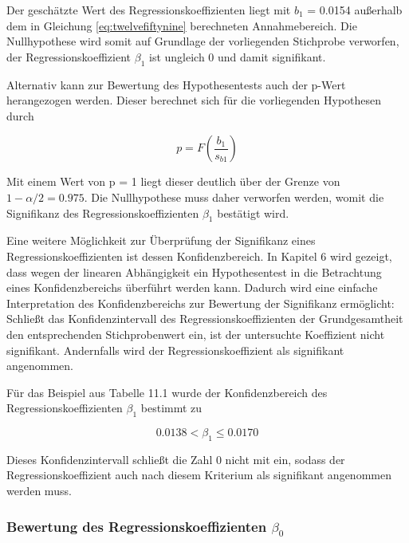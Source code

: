 \noindent Der gesch\"{a}tzte Wert des Regressionskoeffizienten liegt mit $b_{1}$ = 0.0154 au{\ss}erhalb dem in Gleichung \eqref{eq:twelvefiftynine} berechneten Annahmebereich. Die Nullhypothese wird somit auf Grundlage der vorliegenden Stichprobe verworfen, der Regressionskoeffizient $\beta_{1}$ ist ungleich 0 und damit signifikant.\newline

\noindent Alternativ kann zur Bewertung des Hypothesentests auch der p-Wert herangezogen werden. Dieser berechnet sich f\"{u}r die vorliegenden Hypothesen durch

\begin{equation}\label{eq:twelvesixty}
p=F\left(\dfrac{b_{1}}{s_{b1}} \right)
\end{equation}

\noindent Mit einem Wert von p = 1 liegt dieser deutlich \"{u}ber der Grenze von $1 - \alpha/2 = 0.975$. Die Nullhypothese muss daher verworfen werden, womit die Signifikanz des Regressionskoeffizienten $\beta_{1}$ best\"{a}tigt wird.\newline

\noindent Eine weitere M\"{o}glichkeit zur \"{U}berpr\"{u}fung der Signifikanz eines Regressionskoeffizienten ist dessen Konfidenzbereich. In Kapitel 6 wird gezeigt, dass wegen der linearen Abh\"{a}ngigkeit ein Hypothesentest in die Betrachtung eines Konfidenzbereichs \"{u}berf\"{u}hrt werden kann. Dadurch wird eine einfache Interpretation des Konfidenzbereichs zur Bewertung der Signifikanz erm\"{o}glicht: Schlie{\ss}t das Konfidenzintervall des Regressionskoeffizienten der Grundgesamtheit den entsprechenden Stichprobenwert ein, ist der untersuchte Koeffizient nicht signifikant. Andernfalls wird der Regressionskoeffizient als signifikant angenommen.\newline

\noindent F\"{u}r das Beispiel aus Tabelle 11.1 wurde der Konfidenzbereich des Regressionskoeffizienten $\beta_{1}$ bestimmt zu 

\begin{equation}\label{eq:twelvesixtyone}
0.0138 <\beta _{1} \le  0.0170
\end{equation}

\noindent Dieses Konfidenzintervall schlie{\ss}t die Zahl 0 nicht mit ein, sodass der Regressionskoeffizient auch nach diesem Kriterium als signifikant angenommen werden muss.

\clearpage

\subsubsection{Bewertung des Regressionskoeffizienten \texorpdfstring{$\beta_{0}$}{Lg}}

